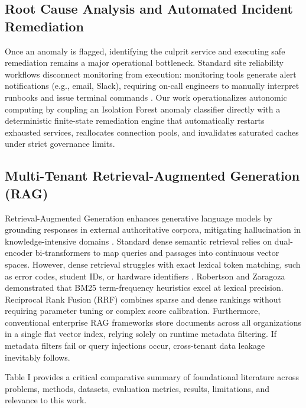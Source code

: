 \documentclass[12pt,onecolumn,draftclsnofoot]{IEEEtran}
\begin{document}
\subsection{Root Cause Analysis and Automated Incident Remediation}
Once an anomaly is flagged, identifying the culprit service and executing safe remediation remains a major operational bottleneck. Standard site reliability workflows disconnect monitoring from execution: monitoring tools generate alert notifications (e.g., email, Slack), requiring on-call engineers to manually interpret runbooks and issue terminal commands \cite{beyer2016site}. Our work operationalizes autonomic computing by coupling an Isolation Forest anomaly classifier directly with a deterministic finite-state remediation engine that automatically restarts exhausted services, reallocates connection pools, and invalidates saturated caches under strict governance limits.

\subsection{Multi-Tenant Retrieval-Augmented Generation (RAG)}
Retrieval-Augmented Generation enhances generative language models by grounding responses in external authoritative corpora, mitigating hallucination in knowledge-intensive domains \cite{lewis2020retrieval}. Standard dense semantic retrieval relies on dual-encoder bi-transformers to map queries and passages into continuous vector spaces. However, dense retrieval struggles with exact lexical token matching, such as error codes, student IDs, or hardware identifiers \cite{robertson2009probabilistic}. Robertson and Zaragoza \cite{robertson2009probabilistic} demonstrated that BM25 term-frequency heuristics excel at lexical precision. Reciprocal Rank Fusion (RRF) combines sparse and dense rankings without requiring parameter tuning or complex score calibration. Furthermore, conventional enterprise RAG frameworks store documents across all organizations in a single flat vector index, relying solely on runtime metadata filtering. If metadata filters fail or query injections occur, cross-tenant data leakage inevitably follows.

Table I provides a critical comparative summary of foundational literature across problems, methods, datasets, evaluation metrics, results, limitations, and relevance to this work.
\end{document}
